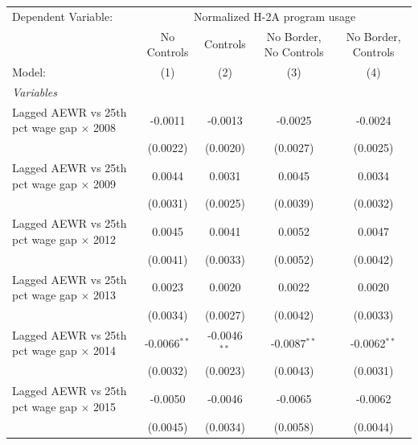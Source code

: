 
\begingroup
\centering
\begin{tabular}{lcccc}
   \tabularnewline \midrule \midrule
   Dependent Variable: & \multicolumn{4}{c}{Normalized H-2A program usage}\\
                                                   & No Controls     & Controls        & No Border, No Controls & No Border, Controls \\   
   Model:                                          & (1)             & (2)             & (3)                    & (4)\\  
   \midrule
   \emph{Variables}\\
   Lagged AEWR vs 25th pct wage gap $\times$ 2008  & -0.0011         & -0.0013         & -0.0025                & -0.0024\\   
                                                   & (0.0022)        & (0.0020)        & (0.0027)               & (0.0025)\\   
   Lagged AEWR vs 25th pct wage gap $\times$ 2009  & 0.0044          & 0.0031          & 0.0045                 & 0.0034\\   
                                                   & (0.0031)        & (0.0025)        & (0.0039)               & (0.0032)\\   
   Lagged AEWR vs 25th pct wage gap $\times$ 2012  & 0.0045          & 0.0041          & 0.0052                 & 0.0047\\   
                                                   & (0.0041)        & (0.0033)        & (0.0052)               & (0.0042)\\   
   Lagged AEWR vs 25th pct wage gap $\times$ 2013  & 0.0023          & 0.0020          & 0.0022                 & 0.0020\\   
                                                   & (0.0034)        & (0.0027)        & (0.0042)               & (0.0033)\\   
   Lagged AEWR vs 25th pct wage gap $\times$ 2014  & -0.0066$^{**}$  & -0.0046$^{**}$  & -0.0087$^{**}$         & -0.0062$^{**}$\\   
                                                   & (0.0032)        & (0.0023)        & (0.0043)               & (0.0031)\\   
   Lagged AEWR vs 25th pct wage gap $\times$ 2015  & -0.0050         & -0.0046         & -0.0065                & -0.0062\\   
                                                   & (0.0045)        & (0.0034)        & (0.0058)               & (0.0044)\\   

\end{tabular}

